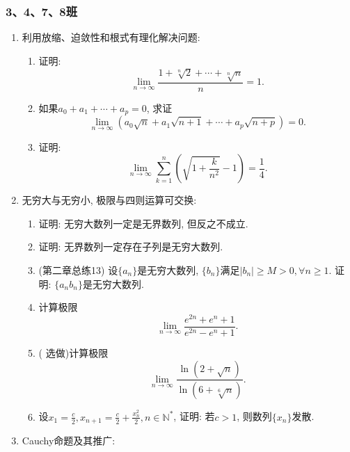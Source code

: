 \documentclass[UTF8,11pt, a4paper, oneside, fontset=none]{ctexbook}
\begin{document}
\subsubsection*{3、4、7、8班}
\begin{enumerate}

\item 利用放缩、迫敛性和根式有理化解决问题:

\begin{enumerate}
\item 证明:
\[
\lim_{n \to \infty} \frac{1 + \sqrt[n]{2} + \cdots + \sqrt[n]{n}}{n} = 1.
\]

\item
如果$a_0 + a_1 + \cdots + a_p =0$, 求证
\[
\lim_{n \to \infty} (a_0 \sqrt n + a_1 \sqrt{n+1} + \cdots + a_p \sqrt{n+p})=0.
\]

\item 证明:
\[
\lim_{n \to \infty} \sum_{k=1}^n \left( \sqrt{1 + \frac{k}{n^2} } -1\right) = \frac{1}{4}.
\]

\end{enumerate}

\item 无穷大与无穷小, 极限与四则运算可交换:

\begin{enumerate}

\item 证明: 无穷大数列一定是无界数列, 但反之不成立. 

\item 证明: 无界数列一定存在子列是无穷大数列.

\item (第二章总练13) 设$\{ a_n \}$是无穷大数列, $\{b_n \}$满足$|b_n| \geq M >0, \forall n \geq 1$. 证明: $\{ a_n b_n \}$是无穷大数列.

\item 计算极限
\[
\lim_{n \to \infty} \frac{e^{2n} + e^n + 1}{e^{2n} - e^n + 1}.
\]
\item ({\color{red} 选做})计算极限
\[
\lim_{n \to \infty} \frac{\ln (2 + \sqrt n)}{\ln(6 + \sqrt[6]{n})}.
\]
 \item 设$x_1 = \frac{c}{2}, x_{n+1} = \frac{c}{2} + \frac{x_n^2}{2}, n \in \mathbb N^*$, 证明: 若$c>1$, 则数列$\{x_n \}$发散.

\end{enumerate}

\item Cauchy命题及其推广:

\begin{enumerate}


\end{enumerate}
\end{enumerate}
\end{document}
